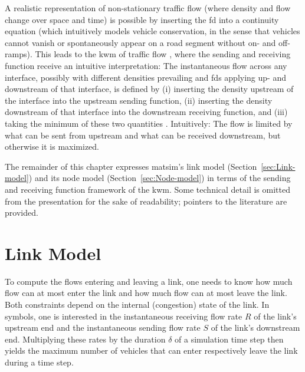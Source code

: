 A realistic representation of non-stationary traffic flow (where density
and flow change over space and time) is possible by inserting the
\gls{fd} into a continuity equation (which intuitively models vehicle conservation,
in the sense that vehicles cannot vanish or spontaneously appear on
a road segment without on- and off-ramps). This leads to the \gls{kwm} 
of traffic flow \citep[][]{lighthill-1955,richards-1956},
where the sending and receiving function receive an intuitive interpretation:
The instantaneous flow across any interface, possibly with different
densities prevailing and \glspl{fd} applying up- and downstream of that interface,
is defined by (i) inserting the density upstream of the interface
into the upstream sending function, (ii) inserting the density downstream
of that interface into the downstream receiving function, and (iii)
taking the minimum of these two quantities \citep{Daganzo_TransResPartB_1994,lebacque-1996}.
Intuitively: The flow is limited by what can be sent from upstream
and what can be received downstream, but otherwise it is maximized.

The remainder of this chapter expresses \gls{matsim}\textquoteright{}s link
model (Section~\ref{sec:Link-model}) and its node model (Section~\ref{sec:Node-model})
in terms of the sending and receiving function framework of the \gls{kwm}.
Some technical detail is omitted from the presentation for the sake
of readability; pointers to the literature are provided.

\section{\label{sec:Link-model}Link Model}
To compute the flows entering and leaving a link, one needs to know
how much flow can at most enter the link and how much flow can at
most leave the link. Both constraints depend on the internal (congestion)
state of the link. In symbols, one is interested in the instantaneous
receiving flow rate $R$ of the link's upstream end and the instantaneous
sending flow rate $S$ of the link's downstream end. Multiplying these
rates by the duration $\delta$ of a simulation time step then yields
the maximum number of vehicles that can enter respectively leave the link
during a time step.

